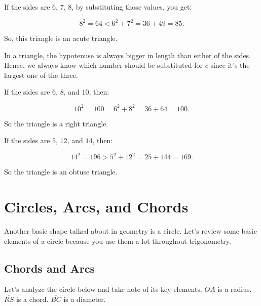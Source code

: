 \begin{example}
	\label{exm:type_of_triangle}

	If the sides are $6$, $7$, $8$, by substituting those values, you get:

	\[ 8^{2} = 64 < 6^{2} + 7^{2} = 36 + 49 = 85 . \]

	So, this triangle is an acute triangle.
\end{example}

\begin{note}
	\label{not:which_number_is_the_hypotenuse}

	In a triangle, the hypotenuse is always bigger in length than either of the
	sides. Hence, we always know which number should be substituted for $c$ since
	it's the largest one of the three.

	If the sides are $6$, $8$, and $10$, then:

	\[ 10^{2} = 100 = 6^{2} + 8^{2} = 36 + 64 = 100 . \]

	So the triangle is a right triangle.

	If the sides are $5$, $12$, and $14$, then:

	\[ 14^{2} = 196 > 5^{2} + 12^{2} = 25 + 144 = 169 . \]

	So the triangle is an obtuse triangle.
\end{note}



\section{Circles, Arcs, and Chords}
\label{sec:circles_arcs_and_chords}

Another basic shape talked about in geometry is a circle. Let's review some
basic elements of a circle because you use them a lot throughout trigonometry.

\subsection{Chords and Arcs}
\label{sub_sec:chords_and_arcs}

Let's analyze the circle below and take note of its key elements.
$\overline{OA}$ is a radius. $\overline{RS}$ is a chord. $\overline{BC}$ is a
diameter.

\newpage

